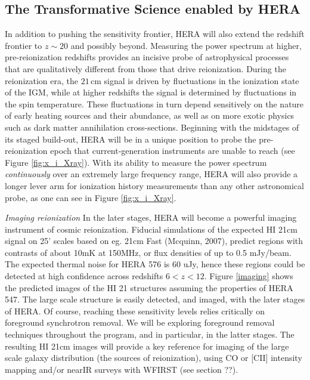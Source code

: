 \documentclass[preprint]{aastex}
\begin{document}
\subsection{The Transformative Science enabled by HERA}


In addition to pushing the sensitivity frontier, HERA will also extend the redshift frontier 
to $z \sim 20$ and possibly beyond.  Measuring the power spectrum at higher, pre-reionization redshifts provides
an incisive probe of astrophysical processes that are qualitatively different from those that
drive reionization.  During the reionization era, the $21\,\textrm{cm}$ signal is driven by
fluctuations in the ionization state of the IGM, while at higher redshifts the signal is determined
by fluctuations in the spin temperature.  These fluctuations in turn depend sensitively on the nature of early heating sources  and their abundance, as well as on more exotic physics such as dark matter annihilation cross-sections.  Beginning with the midstages of its staged build-out, HERA will be in a unique position to probe the pre-reionization epoch that current-generation instruments are unable to reach (see Figure \ref{fig:x_i_Xray}).  With its ability to measure the power spectrum \emph{continuously} over an extremely large frequency range,
HERA will also provide a longer lever arm for ionization history measurements than any other astronomical probe,
as one can see in Figure \ref{fig:x_i_Xray}.

{\sl Imaging reionization} In the later stages, HERA will become a powerful imaging instrument of cosmic reionization. Fiducial simulations of the expected HI 21cm signal on 25' scales based on eg. 21cm Fast (Mcquinn, 2007), predict regions with contrasts of about 10mK at 150MHz, or flux densities of up to 0.5 mJy/beam. The expected thermal noise for HERA 576 is 60 uJy, hence these regions could be detected at high confidence across redshifts $6<z<12$. Figure \ref{imaging} shows the predicted images of the HI 21 structures  assuming the properties of HERA 547. The large scale structure is easily detected, and imaged, with the later stages of HERA. Of course, reaching these sensitivity levels relies critically on foreground synchrotron removal. We will be exploring foreground removal techniques throughout the program, and in particular, in the latter stages. The resulting HI 21cm images will provide a key reference for imaging of the large scale galaxy distribution (the sources of reionization), using CO or [CII] intensity mapping and/or nearIR surveys with WFIRST (see section ??).
\end{document}
